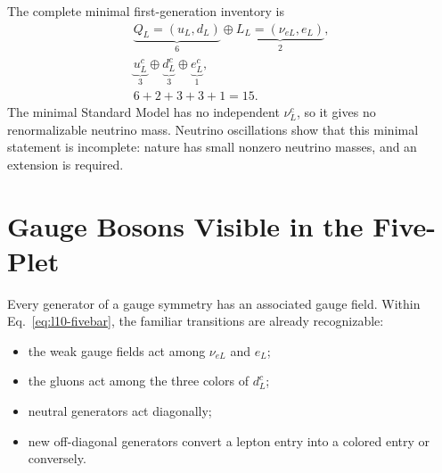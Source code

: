 
The complete minimal first-generation inventory is
\begin{equation}
\begin{gathered}
\underbrace{Q_L=(u_L,d_L)}_{6}
\oplus
\underbrace{L_L=(\nu_{eL},e_L)}_{2},\\
\underbrace{u^c_L}_{3}
\oplus
\underbrace{d^c_L}_{3}
\oplus
\underbrace{e^c_L}_{1},\\
6+2+3+3+1=15.
\end{gathered}
\label{eq:l10-fifteen}
\end{equation}
The minimal Standard Model has no independent \(\nu^c_L\), so it gives no renormalizable neutrino mass. Neutrino oscillations show that this minimal statement is incomplete: nature has small nonzero neutrino masses, and an extension is required.

\begin{classroomqa}
\end{classroomqa}

\section{Gauge Bosons Visible in the Five-Plet}

Every generator of a gauge symmetry has an associated gauge field. Within Eq.~\eqref{eq:l10-fivebar}, the familiar transitions are already recognizable:
\begin{itemize}
\item the weak gauge fields act among \(\nu_{eL}\) and \(e_L\);
\item the gluons act among the three colors of \(d^c_L\);
\item neutral generators act diagonally;
\item new off-diagonal generators convert a lepton entry into a colored entry or conversely.
\end{itemize}

